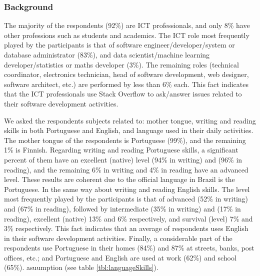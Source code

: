 \subsubsection{Background}
The majority of the respondents (92\%) are ICT professionals, and only 8\% have other professions such as students and academics. The ICT role most frequently played by the participants is that of software engineer/developer/system or database administrator (83\%), and data scientist/machine learning developer/statistics or maths developer (3\%). The remaining roles (technical coordinator, electronics technician, head of software development, web designer, software architect, etc.) are performed by less than 6\% each. This fact indicates that the ICT professionals use Stack Overflow to ask/answer issues related to their software development activities.

We asked the respondents subjects related to: mother tongue, writing and reading skills in both Portuguese and English, and language used in their daily activities. The mother tongue of the respondents is Portuguese (99\%), and the remaining 1\% is Finnish. Regarding writing and reading Portuguese skills, a significant percent of them have an excellent (native) level (94\% in writing) and (96\% in reading), and the remaining 6\% in writing and 4\% in reading have an advanced level. These results are coherent due to the official language in Brazil is the Portuguese. In the same way about writing and reading English skills. The level most frequently played by the participants is that of advanced (52\% in writing) and (67\% in reading), followed by intermediate (35\% in writing) and (17\% in reading), excellent (native) 13\% and 6\% respectively, and survival (level) 7\% and 3\% respectively. This fact indicates that an average of respondents uses English in their software development activities. Finally, a considerable part of the respondents use Portuguese in their homes (84\%) and 87\% at streets, banks, post offices, etc.; and Portuguese and English are used at work (62\%) and school (65\%).  asuumption (see table \ref{tbl:languageSkills}).

